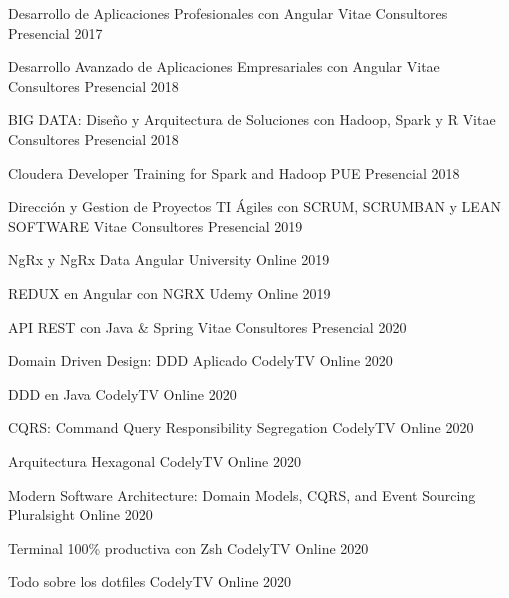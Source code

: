 
\begin{cvhonors}
  \cvhonor
    {Desarrollo de Aplicaciones Profesionales con Angular}
    {Vitae Consultores}
    {Presencial}
    {2017}

  \cvhonor
    {Desarrollo Avanzado de Aplicaciones Empresariales con Angular}
    {Vitae Consultores}
    {Presencial}
    {2018}

  \cvhonor
    {BIG DATA: Diseño y Arquitectura de Soluciones con Hadoop, Spark y R}
    {Vitae Consultores}
    {Presencial}
    {2018}

  \cvhonor
    {Cloudera Developer Training for Spark and Hadoop}
    {PUE}
    {Presencial}
    {2018}

  \cvhonor
    {Dirección y Gestion de Proyectos TI Ágiles con SCRUM, SCRUMBAN y LEAN SOFTWARE}
    {Vitae Consultores}
    {Presencial}
    {2019}

  \cvhonor
    {NgRx y NgRx Data}
    {Angular University}
    {Online}
    {2019}

  \cvhonor
    {REDUX en Angular con NGRX}
    {Udemy}
    {Online}
    {2019}

  \cvhonor
    {API REST con Java \& Spring}
    {Vitae Consultores}
    {Presencial}
    {2020}

  \cvhonor
    {Domain Driven Design: DDD Aplicado}
    {CodelyTV}
    {Online}
    {2020}

  \cvhonor
    {DDD en Java}
    {CodelyTV}
    {Online}
    {2020}

  \cvhonor
    {CQRS: Command Query Responsibility Segregation}
    {CodelyTV}
    {Online}
    {2020}

  \cvhonor
    {Arquitectura Hexagonal}
    {CodelyTV}
    {Online}
    {2020}

  \cvhonor
    {Modern Software Architecture: Domain Models, CQRS, and Event Sourcing}
    {Pluralsight}
    {Online}
    {2020}

  \cvhonor
    {Terminal 100\% productiva con Zsh}
    {CodelyTV}
    {Online}
    {2020}

  \cvhonor
    {Todo sobre los dotfiles}
    {CodelyTV}
    {Online}
    {2020}
\end{cvhonors}
